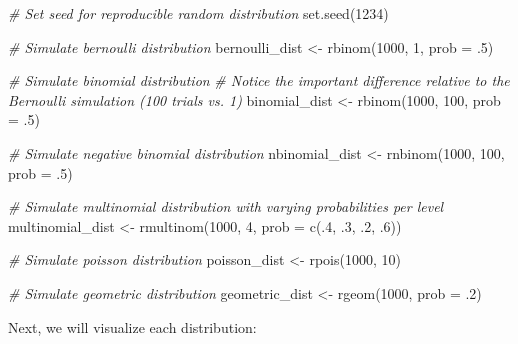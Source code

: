 \documentclass[
]{book}
\newenvironment{Shaded}{\begin{snugshade}}{\end{snugshade}}
\newcommand{\AttributeTok}[1]{\textcolor[rgb]{0.77,0.63,0.00}{#1}}
\newcommand{\CommentTok}[1]{\textcolor[rgb]{0.56,0.35,0.01}{\textit{#1}}}
\newcommand{\DecValTok}[1]{\textcolor[rgb]{0.00,0.00,0.81}{#1}}
\newcommand{\FunctionTok}[1]{\textcolor[rgb]{0.00,0.00,0.00}{#1}}
\newcommand{\NormalTok}[1]{#1}
\newcommand{\OtherTok}[1]{\textcolor[rgb]{0.56,0.35,0.01}{#1}}
\begin{document}
\begin{Shaded}
\begin{Highlighting}[]
\CommentTok{\# Set seed for reproducible random distribution}
\FunctionTok{set.seed}\NormalTok{(}\DecValTok{1234}\NormalTok{)}

\CommentTok{\# Simulate bernoulli distribution}
\NormalTok{bernoulli\_dist }\OtherTok{\textless{}{-}} \FunctionTok{rbinom}\NormalTok{(}\DecValTok{1000}\NormalTok{, }\DecValTok{1}\NormalTok{, }\AttributeTok{prob =}\NormalTok{ .}\DecValTok{5}\NormalTok{)}

\CommentTok{\# Simulate binomial distribution}
\CommentTok{\# Notice the important difference relative to the Bernoulli simulation (100 trials vs. 1)}
\NormalTok{binomial\_dist }\OtherTok{\textless{}{-}} \FunctionTok{rbinom}\NormalTok{(}\DecValTok{1000}\NormalTok{, }\DecValTok{100}\NormalTok{, }\AttributeTok{prob =}\NormalTok{ .}\DecValTok{5}\NormalTok{) }

\CommentTok{\# Simulate negative binomial distribution}
\NormalTok{nbinomial\_dist }\OtherTok{\textless{}{-}} \FunctionTok{rnbinom}\NormalTok{(}\DecValTok{1000}\NormalTok{, }\DecValTok{100}\NormalTok{, }\AttributeTok{prob =}\NormalTok{ .}\DecValTok{5}\NormalTok{) }

\CommentTok{\# Simulate multinomial distribution with varying probabilities per level}
\NormalTok{multinomial\_dist }\OtherTok{\textless{}{-}} \FunctionTok{rmultinom}\NormalTok{(}\DecValTok{1000}\NormalTok{, }\DecValTok{4}\NormalTok{, }\AttributeTok{prob =} \FunctionTok{c}\NormalTok{(.}\DecValTok{4}\NormalTok{, .}\DecValTok{3}\NormalTok{, .}\DecValTok{2}\NormalTok{, .}\DecValTok{6}\NormalTok{))}

\CommentTok{\# Simulate poisson distribution}
\NormalTok{poisson\_dist }\OtherTok{\textless{}{-}} \FunctionTok{rpois}\NormalTok{(}\DecValTok{1000}\NormalTok{, }\DecValTok{10}\NormalTok{) }

\CommentTok{\# Simulate geometric distribution}
\NormalTok{geometric\_dist }\OtherTok{\textless{}{-}} \FunctionTok{rgeom}\NormalTok{(}\DecValTok{1000}\NormalTok{, }\AttributeTok{prob =}\NormalTok{ .}\DecValTok{2}\NormalTok{) }
\end{Highlighting}
\end{Shaded}

Next, we will visualize each distribution:
\end{document}
